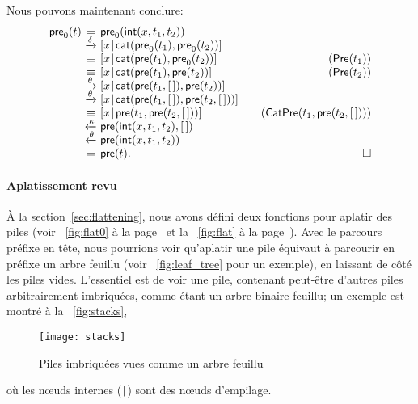 Nous pouvons maintenant conclure:
\begin{equation*}
\begin{array}{r@{\;}c@{\;}l@{\qquad}r}
\fun{pre}_0(t)
& = & \fun{pre}_0(\fun{int}(x,t_1,t_2))\\
& \xrightarrow{\smash{\delta}}
& \cons{x}{\fun{cat}(\fun{pre}_0(t_1), \fun{pre}_0(t_2))}\\
& \equiv & \cons{x}{\fun{cat}(\fun{pre}(t_1), \fun{pre}_0(t_2))}
& (\pred{Pre}{t_1})\\
& \equiv & \cons{x}{\fun{cat}(\fun{pre}(t_1), \fun{pre}(t_2))}
& (\pred{Pre}{t_2})\\
& \xrightarrow{\smash{\theta}}
& \cons{x}{\fun{cat}(\fun{pre}(t_1,\el), \fun{pre}(t_2))}\\
& \xrightarrow{\smash{\theta}}
& \cons{x}{\fun{cat}(\fun{pre}(t_1,\el), \fun{pre}(t_2,\el))}\\
& \equiv
& \cons{x}{\fun{pre}(t_1,\fun{pre}(t_2,\el))}
& (\pred{CatPre}{t_1,\fun{pre}(t_2,\el)})\\
& \xleftarrow{\smash{\kappa}}
& \fun{pre}(\fun{int}(x,t_1,t_2),\el)\\
& \xleftarrow{\smash{\theta}}
& \fun{pre}(\fun{int}(x,t_1,t_2))\\
& = & \fun{pre}(t). & \hfill\Box
\end{array}
\end{equation*}

\paragraph{Aplatissement revu}

À la section~\vref{sec:flattening}, nous avons défini deux fonctions
pour aplatir des piles (voir
\fig~\ref{fig:flat0} à la page~\pageref{fig:flat0} et la
\fig~\ref{fig:flat} à la page~\pageref{fig:flat}). Avec le parcours
préfixe en tête, nous pourrions voir qu'aplatir une pile équivaut à
parcourir en préfixe un arbre feuillu (voir \fig~\vref{fig:leaf_tree} pour un exemple), en
laissant de côté les piles vides. L'essentiel est de voir une pile,
contenant peut-être d'autres piles arbitrairement imbriquées, comme
étant un arbre binaire feuillu; un exemple est montré à la
\fig~\vref{fig:stacks},
\begin{figure}[b]
\centering
\texttt{[image: stacks]}
\caption{Piles imbriquées vues comme un arbre feuillu}
\label{fig:stacks}
\end{figure}
où les nœuds internes (\texttt{|}) sont
des nœuds d'empilage.

